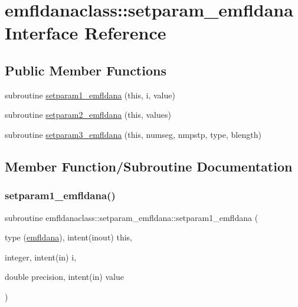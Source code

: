\hypertarget{interfaceemfldanaclass_1_1setparam__emfldana}{}\section{emfldanaclass\+::setparam\+\_\+emfldana Interface Reference}
\label{interfaceemfldanaclass_1_1setparam__emfldana}
\subsection*{Public Member Functions}
\begin{DoxyCompactItemize}
\item 
subroutine \mbox{\hyperlink{interfaceemfldanaclass_1_1setparam__emfldana_a36f89a07ed7756cb8d1466019d82a32a}{setparam1\+\_\+emfldana}} (this, i, value)
\item 
subroutine \mbox{\hyperlink{interfaceemfldanaclass_1_1setparam__emfldana_a2a4f3a168c37d3621624b4111867fbe1}{setparam2\+\_\+emfldana}} (this, values)
\item 
subroutine \mbox{\hyperlink{interfaceemfldanaclass_1_1setparam__emfldana_a4e8f06b9117c3766c829eced93c2d474}{setparam3\+\_\+emfldana}} (this, numseg, nmpstp, type, blength)
\end{DoxyCompactItemize}


\subsection{Member Function/\+Subroutine Documentation}
\mbox{\label{interfaceemfldanaclass_1_1setparam__emfldana_a36f89a07ed7756cb8d1466019d82a32a}} 
\subsubsection{\texorpdfstring{setparam1\_emfldana()}{setparam1\_emfldana()}}
{\footnotesize\ttfamily subroutine emfldanaclass\+::setparam\+\_\+emfldana\+::setparam1\+\_\+emfldana (\begin{DoxyParamCaption}\item[{type (\mbox{\hyperlink{namespaceemfldanaclass_structemfldanaclass_1_1emfldana}{emfldana}}), intent(inout)}]{this,  }\item[{integer, intent(in)}]{i,  }\item[{double precision, intent(in)}]{value }\end{DoxyParamCaption})}

